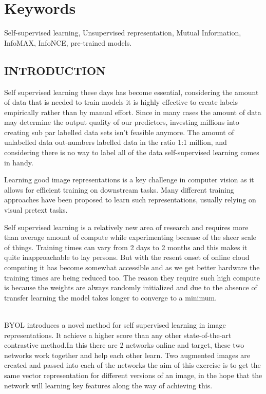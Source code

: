 \documentclass[a4paper, 12pt]{article}
\begin{document}
\par

\section*{Keywords}
Self-supervised learning, Unsupervised representation, Mutual Information, InfoMAX, InfoNCE, pre-trained models.
\newpage
{}
\begin{center}
\section{INTRODUCTION}
\end{center}
\par
Self supervised learning these days has become essential, considering the amount of data that is needed to train models it is highly effective to create labels empirically rather than by manual effort. Since in many cases the amount of data may determine the output quality of our predictors, investing millions into creating sub par labelled data sets isn't feasible anymore. The amount of unlabelled data out-numbers labelled data in the ratio 1:1 million, and considering there is no way to label all of the data self-supervised learning comes in handy.
 \\ 
\par
Learning good image representations is a key challenge
in computer vision as it allows for efficient
training on downstream tasks. Many different training approaches have been proposed to learn such representations, usually relying on visual pretext
tasks.\\

\par
Self supervised learning is a relatively new area of research and requires more than average amount of compute while experimenting because of the sheer scale of things. Training times can vary from 2 days to 2 months and this makes it quite inapproachable to lay persons. But with the resent onset of online cloud computing it has become somewhat accessible and as we get better hardware the training times are being reduced too. The reason they require such high compute is because the weights are always randomly initialized and due to the absence of transfer learning the model takes longer to converge to a minimum.\\

\\

\par 
BYOL introduces a novel method for self supervised learning in image representations. It achieve a higher score than any other state-of-the-art contrastive method.In this there are 2 networks online and target, these two networks work together and help each other learn. Two augmented images are created and passed into each of the networks the aim of this exercise is to get the same vector representation for different versions of an image, in the hope that the network will learning key features along the way of achieving this.\\
\end{document}
